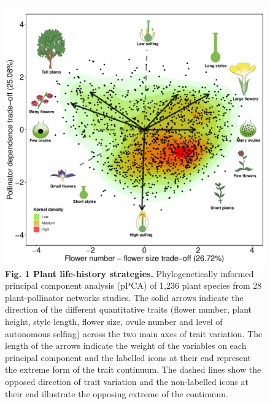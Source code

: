 \documentclass[
  12pt,
  a4paper,
]{article}
\begin{document}
\begin{figure}
\centering
\includegraphics{output/figures/unnamed-chunk-1-1.pdf}
\caption{\label{fig:unnamed-chunk-1}\textbf{Fig. 1 \textbar{} Plant life-history strategies.} Phylogenetically informed principal component analysis (pPCA) of 1,236 plant species from 28 plant-pollinator networks studies. The solid arrows indicate the direction of the different quantitative traits (flower number, plant height, style length, flower size, ovule number and level of autonomous selfing) across the two main axes of trait variation. The length of the arrows indicate the weight of the variables on each principal component and the labelled icons at their end represent the extreme form of the trait continuum. The dashed lines show the opposed direction of trait variation and the non-labelled icons at their end illustrate the opposing extreme of the continuum.}
\end{figure}
\end{document}
